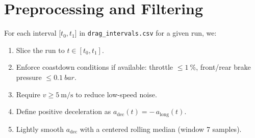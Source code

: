 \documentclass[11pt,a4paper]{article}
\begin{document}
\section{Preprocessing and Filtering}
For each interval [\(t_0, t_1\)] in \texttt{drag\_intervals.csv} for a given run, we:
\begin{enumerate}
  \item Slice the run to \(t\in[t_0,t_1]\).
  \item Enforce coastdown conditions if available: throttle \(\leq\SI{1}{\%}\), front/rear brake pressure \(\leq\SI{0.1}{bar}\).
  \item Require \(v\geq\SI{5}{\meter\per\second}\) to reduce low-speed noise.
  \item Define positive deceleration as \(a_\text{dec}(t) = -\,a_\text{long}(t)\).
  \item Lightly smooth \(a_\text{dec}\) with a centered rolling median (window 7 samples).
\end{enumerate}
\end{document}
